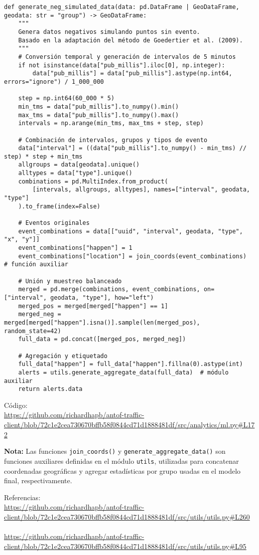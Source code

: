 \documentclass[12pt]{article}
\begin{document}
\begin{verbatim}
def generate_neg_simulated_data(data: pd.DataFrame | GeoDataFrame, geodata: str = "group") -> GeoDataFrame:
    """
    Genera datos negativos simulando puntos sin evento.
    Basado en la adaptación del método de Goedertier et al. (2009).
    """
    # Conversión temporal y generación de intervalos de 5 minutos
    if not isinstance(data["pub_millis"].iloc[0], np.integer):
        data["pub_millis"] = data["pub_millis"].astype(np.int64, errors="ignore") / 1_000_000

    step = np.int64(60_000 * 5)
    min_tms = data["pub_millis"].to_numpy().min()
    max_tms = data["pub_millis"].to_numpy().max()
    intervals = np.arange(min_tms, max_tms + step, step)

    # Combinación de intervalos, grupos y tipos de evento
    data["interval"] = ((data["pub_millis"].to_numpy() - min_tms) // step) * step + min_tms
    allgroups = data[geodata].unique()
    alltypes = data["type"].unique()
    combinations = pd.MultiIndex.from_product(
        [intervals, allgroups, alltypes], names=["interval", geodata, "type"]
    ).to_frame(index=False)

    # Eventos originales
    event_combinations = data[["uuid", "interval", geodata, "type", "x", "y"]]
    event_combinations["happen"] = 1
    event_combinations["location"] = join_coords(event_combinations)  # función auxiliar

    # Unión y muestreo balanceado
    merged = pd.merge(combinations, event_combinations, on=["interval", geodata, "type"], how="left")
    merged_pos = merged[merged["happen"] == 1]
    merged_neg = merged[merged["happen"].isna()].sample(len(merged_pos), random_state=42)
    full_data = pd.concat([merged_pos, merged_neg])

    # Agregación y etiquetado
    full_data["happen"] = full_data["happen"].fillna(0).astype(int)
    alerts = utils.generate_aggregate_data(full_data)  # módulo auxiliar
    return alerts.data
\end{verbatim}

Código: \\
\url{https://github.com/richardhapb/antof-traffic-client/blob/72c1e2cea730670bffb58f0844cd71d1888481df/src/analytics/ml.py#L172}

\noindent\textbf{Nota:}
Las funciones \texttt{join\_coords()} y \texttt{generate\_aggregate\_data()} son funciones auxiliares definidas en el módulo \texttt{utils}, utilizadas para concatenar coordenadas geográficas y agregar estadísticas por grupo usadas en el modelo final, respectivamente.

Referencias: \\
\url{https://github.com/richardhapb/antof-traffic-client/blob/72c1e2cea730670bffb58f0844cd71d1888481df/src/utils/utils.py#L260} \\\\
\url{https://github.com/richardhapb/antof-traffic-client/blob/72c1e2cea730670bffb58f0844cd71d1888481df/src/utils/utils.py#L95}
\newpage
\end{document}
